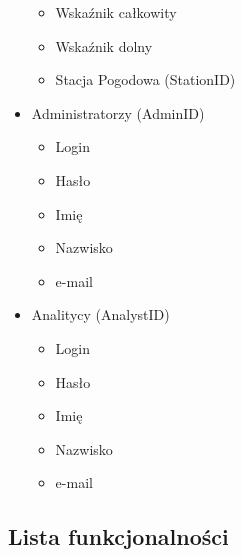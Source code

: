 \documentclass[12pt,a4paper]{article}
\begin{document}
\begin{footnotesize}
\begin{itemize}
	\begin{itemize}
	\item Wskaźnik całkowity
	\item Wskaźnik dolny
	\item Stacja Pogodowa (StationID)
	\end{itemize}
\item Administratorzy (AdminID)
    \begin{itemize}
    \item Login
    \item Hasło
    \item Imię
    \item Nazwisko
    \item e-mail
    \end{itemize}
\item Analitycy (AnalystID)
    \begin{itemize}
    \item Login
    \item Hasło
    \item Imię
    \item Nazwisko
    \item e-mail
    \end{itemize}
\end{itemize}
\end{footnotesize}
\newpage
\subsection{Lista funkcjonalności}
\begin{table}[!htb]
\centering
\caption{Poziomy kompetencji klientów} 
\end{table}
\end{document}
